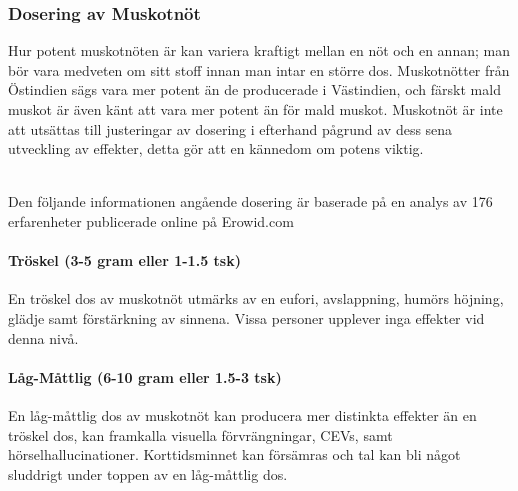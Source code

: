 







\subsubsection{Dosering av Muskotnöt}
Hur potent muskotnöten är kan variera kraftigt mellan en nöt och en annan;
man bör vara medveten om sitt stoff innan man intar en större dos.
Muskotnötter från Östindien sägs vara mer potent än de producerade i Västindien, och färskt
mald muskot är även känt att vara mer potent än för mald muskot.\cite{entheogenreview}
Muskotnöt är inte att utsättas till justeringar av dosering i efterhand pågrund
av dess sena utveckling av effekter, detta gör att en kännedom om potens viktig.
\cite{entheogenreview}

\\

Den följande informationen angående dosering är baserade på en analys av 176 erfarenheter publicerade online på Erowid.com

\paragraph{Tröskel (3-5 gram eller 1-1.5 tsk)}
En tröskel dos av muskotnöt utmärks av en eufori, avslappning, humörs höjning, glädje samt
förstärkning av sinnena.
Vissa personer upplever inga effekter vid denna nivå.

\paragraph{Låg-Måttlig (6-10 gram eller 1.5-3 tsk)}
En låg-måttlig dos av muskotnöt kan producera mer distinkta effekter än en tröskel dos, kan framkalla visuella förvrängningar, CEVs, samt hörselhallucinationer.
Korttidsminnet kan försämras och tal kan bli något sluddrigt under toppen av en
låg-måttlig dos.

